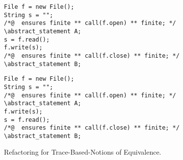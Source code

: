 \begin{figure}
\begin{lstlisting}[style=refinity]
File f = new File();
String s = "";
/*@  ensures finite ** call(f.open) ** finite; */
\abstract_statement A;     
s = f.read();
f.write(s);
/*@  ensures finite ** call(f.close) ** finite; */
\abstract_statement B;     
\end{lstlisting}
\begin{lstlisting}[style=refinity]
File f = new File();
String s = "";
/*@  ensures finite ** call(f.open) ** finite; */
\abstract_statement A;     
f.write(s);
s = f.read();
/*@  ensures finite ** call(f.close) ** finite; */
\abstract_statement B;     
\end{lstlisting}
\caption{Refactoring for Trace-Based-Notions of Equivalence.}
\label{fig:sth}
\end{figure}







